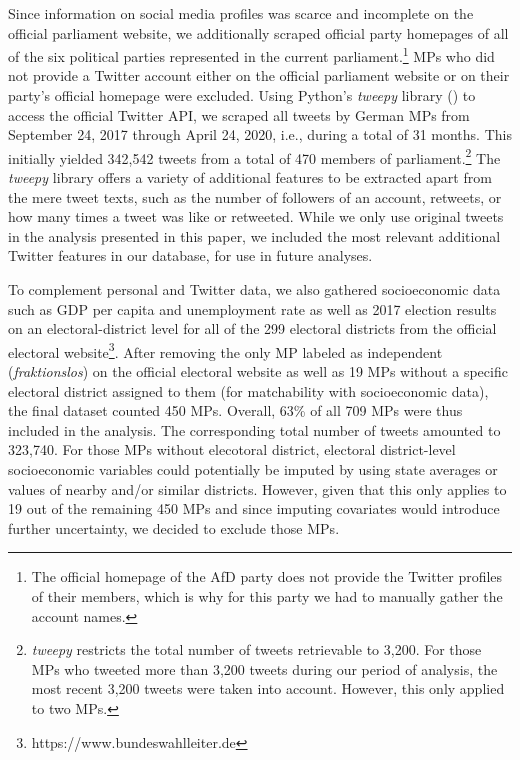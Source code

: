 Since information on social media profiles was scarce and incomplete on the official parliament website, we additionally scraped official party homepages of all of the six political parties represented in the current parliament.\footnote{The official homepage of the AfD party does not provide the Twitter profiles of their members, which is why for this party we had to manually gather the account names.} MPs who did not provide a Twitter account either on the official parliament website or on their party's official homepage were excluded. Using Python's \textit{tweepy} library (\citealp{roesslein2020tweepy}) to access the official Twitter API, we scraped all tweets by German MPs from September 24, 2017 through April 24, 2020, i.e., during a total of 31 months. This initially yielded 342,542 tweets from a total of 470 members of parliament.\footnote{\textit{tweepy} restricts the total number of tweets retrievable to 3,200. For those MPs who tweeted more than 3,200 tweets during our period of analysis, the most recent 3,200 tweets were taken into account. However, this only applied to two MPs.} The \textit{tweepy} library offers a variety of additional features to be extracted apart from the mere tweet texts, such as the number of followers of an account, retweets, or how many times a tweet was like or retweeted. While we only use original tweets in the analysis presented in this paper, we included the most relevant additional Twitter features in our database, for use in future analyses.

To complement personal and Twitter data, we also gathered socioeconomic data such as GDP per capita and unemployment rate as well as 2017 election results on an electoral-district level for all of the 299 electoral districts from the official electoral website\footnote{https://www.bundeswahlleiter.de}. After removing the only MP labeled as independent (\textit{fraktionslos}) on the official electoral website as well as 19 MPs without a specific electoral district assigned to them (for matchability with socioeconomic data), the final dataset counted 450 MPs. Overall, 63\% of all 709 MPs were thus included in the analysis. The corresponding total number of tweets amounted to 323,740. For those MPs without elecotoral district, electoral district-level socioeconomic variables could potentially be imputed by using state averages or values of nearby and/or similar districts. However, given that this only applies to 19 out of the remaining 450 MPs and since imputing covariates would introduce further uncertainty, we decided to exclude those MPs.

